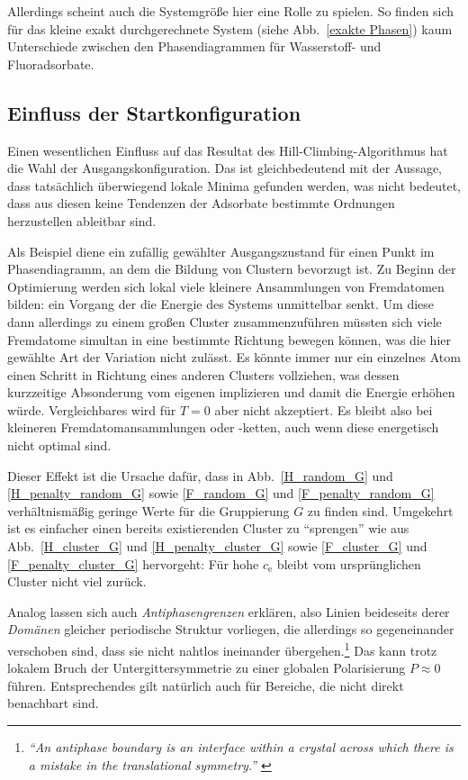 \documentclass[a4paper, 10pt, twoside, openany]{book} %
\def \cE {c_\mathrm{e}}
\begin{document}
Allerdings scheint auch die Systemgröße hier eine Rolle zu spielen. So finden sich für das kleine exakt durchgerechnete System (siehe Abb.~\ref{exakte Phasen}) kaum Unterschiede zwischen den Phasendiagrammen für Wasserstoff- und Fluoradsorbate.

\subsection{Einfluss der Startkonfiguration}
\label{Startkonfiguration}

Einen wesentlichen Einfluss auf das Resultat des Hill-Climbing-Algorithmus hat die Wahl der Ausgangskonfiguration. Das ist gleichbedeutend mit der Aussage, dass tatsächlich überwiegend lokale Minima gefunden werden, was nicht bedeutet, dass aus diesen keine Tendenzen der Adsorbate bestimmte Ordnungen herzustellen ableitbar sind.

Als Beispiel diene ein zufällig gewählter Ausgangszustand für einen Punkt im Phasendiagramm, an dem die Bildung von Clustern bevorzugt ist. Zu Beginn der Optimierung werden sich lokal viele kleinere Ansammlungen von Fremdatomen bilden: ein Vorgang der die Energie des Systems unmittelbar senkt. Um diese dann allerdings zu einem großen Cluster zusammenzuführen müssten sich viele Fremdatome simultan in eine bestimmte Richtung bewegen können, was die hier gewählte Art der Variation nicht zulässt. Es könnte immer nur ein einzelnes Atom einen Schritt in Richtung eines anderen Clusters vollziehen, was dessen kurzzeitige Absonderung vom eigenen implizieren und damit die Energie erhöhen würde. Vergleichbares wird für $T = 0$ aber nicht akzeptiert. Es bleibt also bei kleineren Fremdatomansammlungen oder -ketten, auch wenn diese energetisch nicht optimal sind.

Dieser Effekt ist die Ursache dafür, dass in Abb.~\ref{H_random_G} und \ref{H_penalty_random_G} sowie \ref{F_random_G} und \ref{F_penalty_random_G} verhältnismäßig geringe Werte für die Gruppierung $G$ zu finden sind. Umgekehrt ist es einfacher einen bereits existierenden Cluster zu "`sprengen"' wie aus Abb.~\ref{H_cluster_G} und \ref{H_penalty_cluster_G} sowie \ref{F_cluster_G} und \ref{F_penalty_cluster_G} hervorgeht: Für hohe $\cE$ bleibt vom ursprünglichen Cluster nicht viel zurück.

Analog lassen sich auch \emph{Antiphasengrenzen} erklären, also Linien beideseits derer \emph{Domänen} gleicher periodische Struktur vorliegen, die allerdings so gegeneinander verschoben sind, dass sie nicht nahtlos ineinander übergehen.\footnote{\emph{"`An antiphase boundary is an interface within a crystal across which there is a mistake in the translational symmetry."'} \cite[S. 218f]{Putnis}} Das kann trotz lokalem Bruch der Untergittersymmetrie zu einer globalen Polarisierung $P \approx 0$ führen. Entsprechendes gilt natürlich auch für Bereiche, die nicht direkt benachbart sind.
\end{document}
